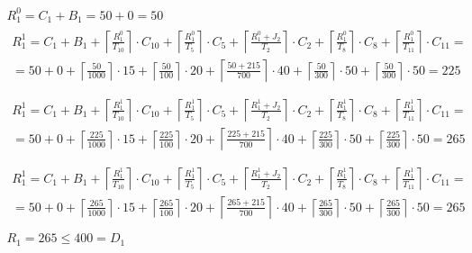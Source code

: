 \begin{gather*}
  R_{1}^0 = C_{1} + B_{1} = 50 + 0 = 50 \\
  \begin{multlined}
    R_1^1 = C_1 + B_1 + \left\lceil\frac{R_1^0}{T_{10}}\right\rceil\cdot C_{10} + %
    \left\lceil\frac{R_1^0}{T_5}\right\rceil\cdot C_5 + %
    \left\lceil\frac{R_1^0 + J_2}{T_2}\right\rceil\cdot C_2 + %
    \left\lceil\frac{R_1^0}{T_8}\right\rceil\cdot C_8 + %
    \left\lceil\frac{R_1^0}{T_{11}}\right\rceil\cdot C_{11} = \\%
    = 50 + 0 + \left\lceil\frac{50}{1000}\right\rceil\cdot 15 + %
    \left\lceil\frac{50}{100}\right\rceil\cdot 20 + %
    \left\lceil\frac{50 + 215}{700}\right\rceil\cdot 40 + %
    \left\lceil\frac{50}{300}\right\rceil\cdot 50 + %
    \left\lceil\frac{50}{300}\right\rceil\cdot 50 = 225 \\
  \end{multlined} \\
  \begin{multlined}
    R_1^1 = C_1 + B_1 + \left\lceil\frac{R_1^1}{T_{10}}\right\rceil\cdot C_{10} + %
    \left\lceil\frac{R_1^1}{T_5}\right\rceil\cdot C_5 + %
    \left\lceil\frac{R_1^1 + J_2}{T_2}\right\rceil\cdot C_2 + %
    \left\lceil\frac{R_1^1}{T_8}\right\rceil\cdot C_8 + %
    \left\lceil\frac{R_1^1}{T_{11}}\right\rceil\cdot C_{11} = \\%
    = 50 + 0 + \left\lceil\frac{225}{1000}\right\rceil\cdot 15 + %
    \left\lceil\frac{225}{100}\right\rceil\cdot 20 + %
    \left\lceil\frac{225 + 215}{700}\right\rceil\cdot 40 + %
    \left\lceil\frac{225}{300}\right\rceil\cdot 50 + %
    \left\lceil\frac{225}{300}\right\rceil\cdot 50 = 265 \\
  \end{multlined} \\
  \begin{multlined}
    R_1^1 = C_1 + B_1 + \left\lceil\frac{R_1^1}{T_{10}}\right\rceil\cdot C_{10} + %
    \left\lceil\frac{R_1^1}{T_5}\right\rceil\cdot C_5 + %
    \left\lceil\frac{R_1^1 + J_2}{T_2}\right\rceil\cdot C_2 + %
    \left\lceil\frac{R_1^1}{T_8}\right\rceil\cdot C_8 + %
    \left\lceil\frac{R_1^1}{T_{11}}\right\rceil\cdot C_{11} = \\%
    = 50 + 0 + \left\lceil\frac{265}{1000}\right\rceil\cdot 15 + %
    \left\lceil\frac{265}{100}\right\rceil\cdot 20 + %
    \left\lceil\frac{265 + 215}{700}\right\rceil\cdot 40 + %
    \left\lceil\frac{265}{300}\right\rceil\cdot 50 + %
    \left\lceil\frac{265}{300}\right\rceil\cdot 50 = 265 \\
  \end{multlined} \\
  R_1 = 265 \le 400 = D_1
\end{gather*}

